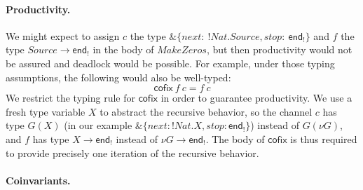 \documentclass[orivec,envcountsame]{llncs}
\newcommand{\with}{\mathbin\binampersand}
\newcommand{\gvout}[2]{{!#1.#2}}
\newcommand{\uto}{\ensuremath{\rightarrow}}
\newcommand{\outterm}{\mkwd{end}_!}
\newcommand{\mkwd}[1]{\mathsf{#1}}
\newcommand{\clabel}[1]{\mathit{#1}}
\newcommand{\lrkwd}{\mkwd{cofix}}
\newcommand{\cofix}{\lrkwd}
\begin{document}

\paragraph{Productivity.}
We might expect to assign $c$ the type $\with \{\clabel{next}:\:\gvout{Nat}{Source},
\clabel{stop}:\:\outterm \}$ and $f$ the type $Source \uto \outterm$ in the body of $MakeZeros$, but
then productivity would not be assured and deadlock would be possible. For example, under those
typing assumptions, the following would also be well-typed:
%
\small\[
  \cofix\:f\:c = f\:c
\]\normalsize
%
We restrict the typing rule for $\cofix$ in order to guarantee productivity. We use a fresh type
variable $X$ to abstract the recursive behavior, so the channel $c$ has type $G(X)$ (in our example
$\with \{\clabel{next}: \gvout{Nat}{X}, \clabel{stop}: \outterm \}$) instead of $G(\nu G)$, and $f$ has type
$X \uto \outterm$ instead of $\nu G \uto \outterm$. The body of $\cofix$ is thus required to provide
precisely one iteration of the recursive behavior.

\paragraph{Coinvariants.}
\end{document}
